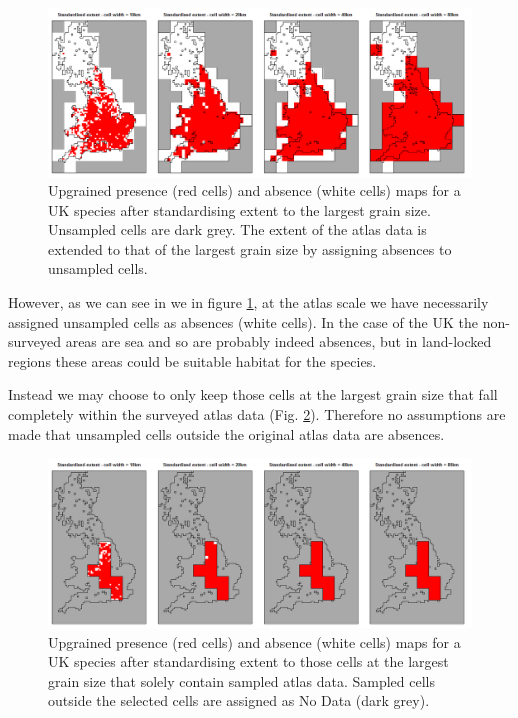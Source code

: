 \documentclass{article}[12pt, a4paper]
\begin{document}
\begin{figure}[thb]
\centering
\includegraphics[width=\linewidth]{All_interior.png}
\caption{Upgrained presence (red cells) and absence (white cells) maps for a UK species after standardising extent to the largest grain size. Unsampled cells are dark grey. The extent of the atlas data is extended to that of the largest grain size by assigning absences to unsampled cells.}
\label{fig:All interior}
\end{figure}

However, as we can see in we in figure \ref{fig:All interior}, at the atlas scale we have necessarily assigned unsampled cells as absences (white cells). In the case of the UK the non-surveyed areas are sea and so are probably indeed absences, but in land-locked regions these areas could be suitable habitat for the species.

Instead we may choose to only keep those cells at the largest grain size that fall completely within the surveyed atlas data (Fig. \ref{fig:Interior only}). Therefore no assumptions are made that unsampled cells outside the original atlas data are absences.

\begin{figure}[hbt]
\centering
\includegraphics[width=\linewidth]{Interior_only.png}
\caption{Upgrained presence (red cells) and absence (white cells) maps for a UK species after standardising extent to those cells at the largest grain size that solely contain sampled atlas data. Sampled cells outside the selected cells are assigned as No Data (dark grey).}
\label{fig:Interior only}
\end{figure}
\end{document}
